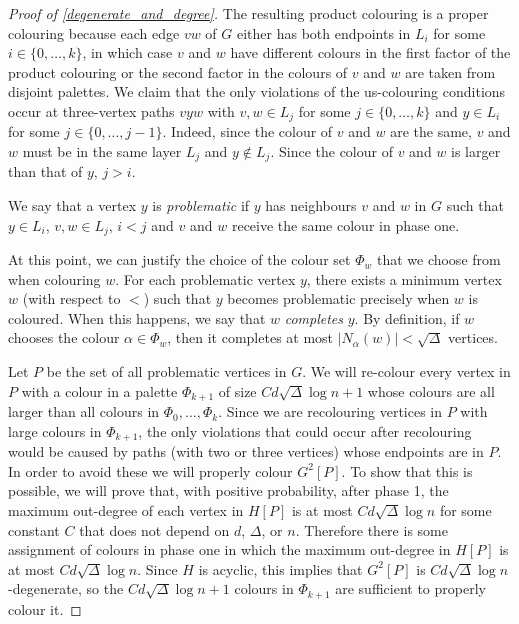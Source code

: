 \documentclass[kpfonts]{patmorin}
\newcommand{\defin}[1]{\emph{\color{brightmaroon}#1}}
\begin{document}
\begin{proof}[Proof of \cref{degenerate_and_degree}]
  The resulting product colouring is a proper colouring because each edge $vw$ of $G$ either has both endpoints in $L_i$ for some $i\in\{0,\ldots,k\}$, in which case $v$ and $w$ have different colours in the first factor of the product colouring or the second factor in the colours of $v$ and $w$ are taken from disjoint palettes.  We claim that the only violations of the us-colouring conditions occur at three-vertex paths $vyw$ with $v,w\in L_j$ for some $j\in\{0,\ldots,k\}$ and $y\in L_i$ for some $j\in\{0,\ldots,j-1\}$. Indeed, since the colour of $v$ and $w$ are the same, $v$ and $w$ must be in the same layer $L_j$ and $y\not\in L_j$.  Since the colour of $v$ and $w$ is larger than that of $y$, $j> i$.

  We say that a vertex $y$ is \defin{problematic} if $y$ has neighbours $v$ and $w$ in $G$ such that $y\in L_i$, $v,w\in L_j$, $i < j$ and $v$ and $w$ receive the same colour in phase one.

  At this point, we can justify the choice of the colour set $\Phi_w$ that we choose from when colouring $w$. For each problematic vertex $y$, there exists a minimum vertex $w$ (with respect to $<$) such that $y$ becomes problematic precisely when $w$ is coloured.  When this happens, we say that $w$ \defin{completes} $y$. By definition, if $w$ chooses the colour $\alpha\in\Phi_w$, then it completes at most $|N_{\alpha}(w)|<\sqrt{\Delta}$ vertices.

  Let $P$ be the set of all problematic vertices in $G$.  We will re-colour every vertex in $P$ with a colour in a palette $\Phi_{k+1}$ of size $Cd\sqrt{\Delta}\log n+1$ whose colours are all larger than all colours in $\Phi_0,\ldots,\Phi_k$.  Since we are recolouring vertices in $P$ with large colours in $\Phi_{k+1}$, the only violations that could occur after recolouring would be caused by paths (with two or three vertices) whose endpoints are in $P$.  In order to avoid these we will properly colour $G^2[P]$.  To show that this is possible, we will prove that, with positive probability, after phase 1, the maximum out-degree of each vertex in $H[P]$ is at most $Cd\sqrt{\Delta}\log n$ for some constant $C$ that does not depend on $d$, $\Delta$, or $n$.  Therefore there is some assignment of colours in phase one in which the maximum out-degree in $H[P]$ is at most $Cd\sqrt{\Delta}\log n$.  Since $H$ is acyclic, this implies that $G^2[P]$ is $Cd\sqrt{\Delta}\log n$-degenerate, so the $Cd\sqrt{\Delta}\log n+1$ colours in $\Phi_{k+1}$ are sufficient to properly colour it.


\end{proof}
\end{document}
